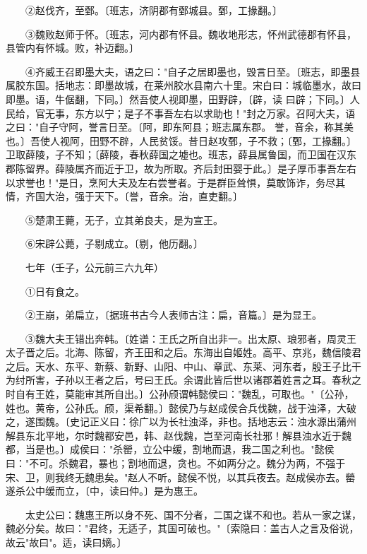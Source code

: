　　②赵伐齐，至鄄。〔班志，济阴郡有鄄城县。鄄，工掾翻。〕

　　③魏败赵师于怀。〔班志，河内郡有怀县。魏收地形志，怀州武德郡有怀县，县管内有怀城。败，补迈翻。〕

　　④齐威王召即墨大夫，语之曰："自子之居即墨也，毁言日至。〔班志，即墨县属胶东国。括地志：即墨故城，在莱州胶水县南六十里。宋白曰：城临墨水，故曰即墨。语，牛倨翻，下同。〕然吾使人视即墨，田野辟，〔辟，读 曰辟；下同。〕人民给，官无事，东方以宁；是子不事吾左右以求助也！"封之万家。召阿大夫，语之曰："自子守阿，誉言日至。〔阿，即东阿县；班志属东郡。 誉，音余，称其美也。〕吾使人视阿，田野不辟，人民贫馁。昔日赵攻鄄，子不救；〔鄄，工掾翻。〕卫取薛陵，子不知；〔薛陵，春秋薛国之墟也。班志，薛县属鲁国，而卫国在汉东郡陈留界。薛陵属齐而近于卫，故为所取。齐后封田婴于此。〕是子厚币事吾左右以求誉也！"是日，烹阿大夫及左右尝誉者。于是群臣耸惧，莫敢饰诈，务尽其情，齐国大治，强于天下。〔誉，音余。治，直吏翻。〕

　　⑤楚肃王薨，无子，立其弟良夫，是为宣王。

　　⑥宋辟公薨，子剔成立。〔剔，他历翻。〕

　　七年（壬子，公元前三六九年）

　　①日有食之。

　　②王崩，弟扁立，〔据班书古今人表师古注：扁，音篇。〕是为显王。

　　③魏大夫王错出奔韩。〔姓谱：王氏之所自出非一。出太原、琅邪者，周灵王太子晋之后。北海、陈留，齐王田和之后。东海出自姬姓。高平、京兆，魏信陵君之后。天水、东平、新蔡、新野、山阳、中山、章武、东莱、河东者，殷王子比干为纣所害，子孙以王者之后，号曰王氏。余谓此皆后世以诸郡着姓言之耳。春秋之时自有王姓，莫能审其所自出。〕公孙颀谓韩懿侯曰："魏乱，可取也。"〔公孙，姓也。黄帝，公孙氏。颀，渠希翻。〕懿侯乃与赵成侯合兵伐魏，战于浊泽，大破之，遂围魏。〔史记正义曰：徐广以为长社浊泽，非也。括地志云：浊水源出蒲州解县东北平地，尔时魏都安邑，韩、赵伐魏，岂至河南长社邪！解县浊水近于魏都，当是也。〕成侯曰："杀罃，立公中缓，割地而退，我二国之利也。"懿侯曰："不可。杀魏君，暴也；割地而退，贪也。不如两分之。魏分为两，不强于宋、卫，则我终无魏患矣。"赵人不听。懿侯不悦，以其兵夜去。赵成侯亦去。罃遂杀公中缓而立，〔中，读曰仲。〕是为惠王。

　　太史公曰：魏惠王所以身不死、国不分者，二国之谋不和也。若从一家之谋，魏必分矣。故曰："君终，无适子，其国可破也。"〔索隐曰：盖古人之言及俗说，故云"故曰"。适，读曰嫡。〕